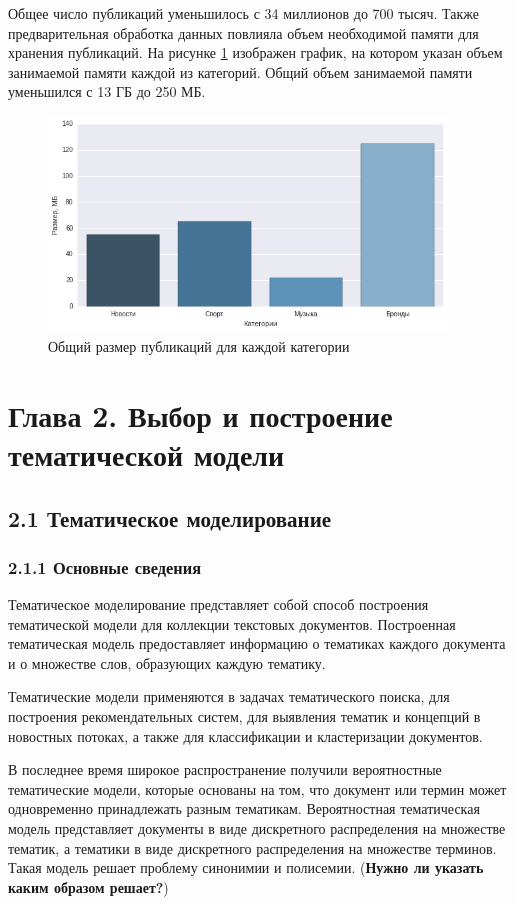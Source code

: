 \documentclass[a4paper]{report}
\begin{document}
	\newpage
	 Общее число публикаций уменьшилось с 34 миллионов до 700 тысяч. Также предварительная обработка данных повлияла объем необходимой памяти для хранения публикаций. На рисунке \ref{fig:sizecat1} изображен график, на котором указан объем занимаемой памяти каждой из категорий. Общий объем занимаемой памяти уменьшился с 13 ГБ до 250 МБ.
	\begin{figure}
		\centering
		\includegraphics[width=400px]
		{imgs/SizeCat1.png}
		\caption{Общий размер публикаций для каждой категории}
		\label{fig:sizecat1}
	\end{figure} 
	\newline
	
	 
	
	
	
	\newpage
	\section{Глава 2. Выбор и построение тематической модели}
	\subsection{2.1 Тематическое моделирование}
	\subsubsection{2.1.1 Основные сведения}
	Тематическое моделирование представляет собой  способ построения тематической модели для коллекции текстовых документов. Построенная тематическая модель предоставляет информацию о тематиках каждого документа и о множестве слов, образующих каждую тематику. 
	
	Тематические модели применяются в задачах тематического поиска, для построения рекомендательных систем, для выявления тематик и концепций в новостных потоках, а также для классификации и кластеризации документов. 
	
	В последнее время широкое распространение получили вероятностные тематические модели, которые основаны на том, что документ или термин может одновременно принадлежать разным тематикам. Вероятностная тематическая модель представляет документы в виде дискретного распределения на множестве тематик, а тематики в виде дискретного распределения на множестве терминов. Такая модель решает проблему синонимии и полисемии. (\textbf{Нужно ли указать каким образом решает?})
	
\end{document}
